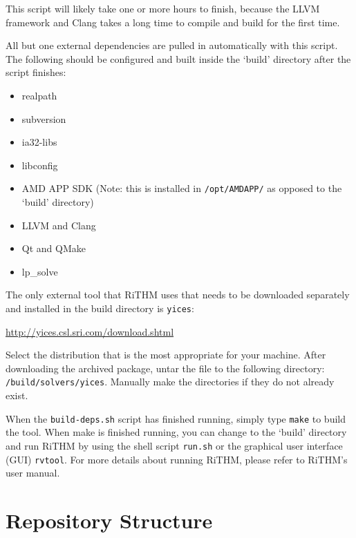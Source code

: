 \documentclass[12pt]{book}
\begin{document}
This script will likely take one or more hours to finish, because the LLVM framework and Clang takes a long time to compile and build for the first time.

All but one external dependencies are pulled in automatically with this script. The following should be configured and built inside the `build' directory after the script finishes:
\begin{itemize}
	\item realpath
	\item subversion
	\item ia32-libs
	\item libconfig
	\item AMD APP SDK (Note: this is installed in {\tt /opt/AMDAPP/} as opposed to the `build' directory)
	\item LLVM and Clang
	\item Qt and QMake
	\item lp\_solve
\end{itemize}


The only external tool that RiTHM uses that needs to be downloaded separately and installed in the build directory is {\tt yices}:
\begin{center}
	\url{http://yices.csl.sri.com/download.shtml}
\end{center}
Select the distribution that is the most appropriate for your machine. After downloading the archived package, untar the file to the following directory: {\tt <local repository root>/build/solvers/yices}. Manually make the directories if they do not already exist.

When the {\tt build-deps.sh} script has finished running, simply type {\tt make} to build the tool. When make is finished running, you can change to the `build' directory and run RiTHM by using the shell script {\tt run.sh} or the graphical user interface (GUI) {\tt rvtool}. For more details about running RiTHM, please refer to RiTHM's user manual.


\chapter{Repository Structure}
\end{document}
